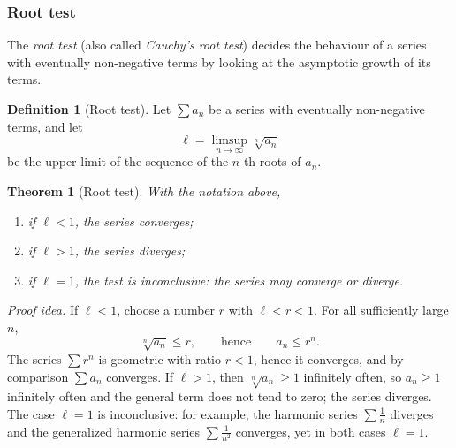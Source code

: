 \documentclass[11pt,a4paper]{article}
\theoremstyle{definition} \newtheorem{definition}{Definition} \theoremstyle{plain} \newtheorem{theorem}{Theorem}
\begin{document}
\subsubsection{Root test}
The \emph{root test} (also called \emph{Cauchy's root test}) decides the behaviour of a series with eventually non-negative terms by looking at the asymptotic growth of its terms.
\begin{definition}[Root test] Let $\sum a_n$ be a series with eventually non-negative terms, and let
\[ \ell = \limsup_{n\to\infty} \sqrt[n]{a_n} \]
be the upper limit of the sequence of the $n$-th roots of $a_n$. \end{definition}
\begin{theorem}[Root test]\label{thm:root-test} With the notation above,
\begin{enumerate} \item if $\ell<1$, the series \emph{converges}; \item if $\ell>1$, the series \emph{diverges}; \item if $\ell=1$, the test is \emph{inconclusive}: the series may converge or diverge. \end{enumerate} \end{theorem}
\emph{Proof idea.}
If $\ell<1$, choose a number $r$ with $\ell<r<1$.
For all sufficiently large $n$,
\[ \sqrt[n]{a_n} \le r, \qquad \text{hence} \qquad a_n \le r^n. \]
The series $\sum r^n$ is geometric with ratio $r<1$, hence it converges, and by comparison $\sum a_n$ converges.
If $\ell>1$, then $\sqrt[n]{a_n}\ge 1$ infinitely often, so $a_n\ge 1$ infinitely often and the general term does not tend to zero; the series diverges.
The case $\ell=1$ is inconclusive: for example, the harmonic series $\sum \frac1n$ diverges and the generalized harmonic series $\sum \frac1{n^2}$ converges, yet in both cases $\ell=1$.
\end{document}
